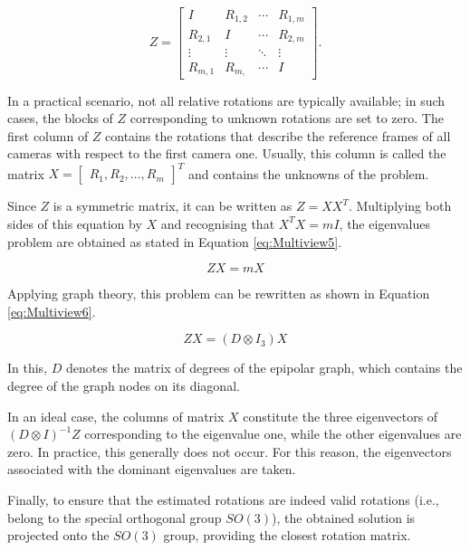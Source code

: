 \begin{equation}
  \label{eq:Multiview4}
  Z = \begin{bmatrix}
  I & R_{1,2} & \cdots & R_{1,m} \\
  R_{2,1} & I & \cdots & R_{2,m} \\
  \vdots & \vdots & \ddots & \vdots \\
  R_{m,1} & R_{m,} & \cdots & I
  \end{bmatrix}.
\end{equation}

In a practical scenario, not all relative rotations are typically available; in such cases, the blocks of $Z$ corresponding to unknown rotations are set to zero.  
The first column of $Z$ contains the rotations that describe the reference frames of all cameras with respect to the first camera one. Usually, this column is called the matrix $X = \begin{bmatrix} R_1, R_2, \dots, R_m \end{bmatrix}^T$ and contains the unknowns of the problem.

Since $Z$ is a symmetric matrix, it can be written as $Z = XX^T$. Multiplying both sides of this equation by $X$ and recognising that $X^T X = mI$, the eigenvalues problem are obtained as stated in Equation \ref{eq:Multiview5}.

\begin{equation}
  \label{eq:Multiview5}
  ZX = m X
\end{equation}

Applying graph theory, this problem can be rewritten as shown in Equation \ref{eq:Multiview6}.

\begin{equation}
  \label{eq:Multiview6}
  ZX = (D \otimes I_{3})X
\end{equation}

In this, $D$ denotes the matrix of degrees of the epipolar graph, which contains the degree of the graph nodes on its diagonal.

In an ideal case, the columns of matrix $X$ constitute the three eigenvectors of $(D \otimes I)^{-1}Z$ corresponding to the eigenvalue one, while the other eigenvalues are zero.  
In practice, this generally does not occur. For this reason, the eigenvectors associated with the dominant eigenvalues are taken.

Finally, to ensure that the estimated rotations are indeed valid rotations (i.e., belong to the special orthogonal group $SO(3)$), the obtained solution is projected onto the $SO(3)$ group, providing the closest rotation matrix.


